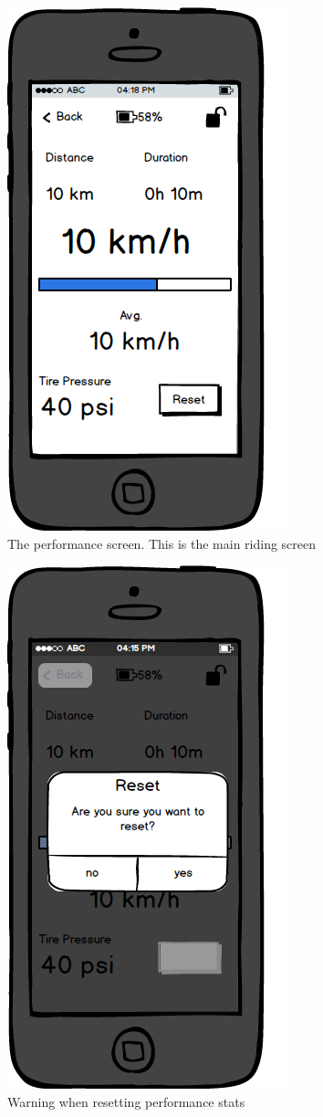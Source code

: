 \documentclass[a4paper]{report}
\begin{document}
\clearpage
\begin{figure}
\centering
\includegraphics[scale=0.9]{figures/prototype_1/perf}
\caption{The performance screen. This is the main riding screen}
\end{figure}
\clearpage
\begin{figure}
\centering
\includegraphics[scale=0.9]{figures/prototype_1/reset_perf}
\caption{Warning when resetting performance stats}
\end{figure}
\end{document}
